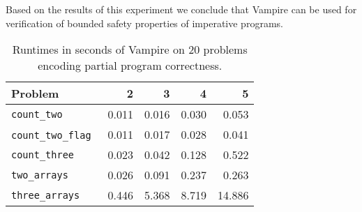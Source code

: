 Based on the results of this experiment we conclude that Vampire can be used for verification of bounded safety properties of imperative programs.


\begin{table}[h]
  \caption{Runtimes in seconds of Vampire on 20 problems encoding partial program correctness.}
  \begin{center}
  \begin{tabular}{lrrrr}
    \hline Problem & 2 & 3 & 4 & 5 \\ \hline
    \verb'count_two'        &  0.011  &  0.016  &  0.030  &  0.053 \\
    \verb'count_two_flag'~  &  0.011  &  0.017  &  0.028  &  0.041 \\
    \verb'count_three'      &  0.023  &  0.042  &  0.128  &  0.522 \\
    \verb'two_arrays'       &  0.026  &  0.091  &  0.237  &  0.263 \\
    \verb'three_arrays'     &  0.446  &  5.368  &  8.719  & 14.886
  \end{tabular}
  \end{center}
  \label{table:examples-results}
  \vspace{-1em}
\end{table}